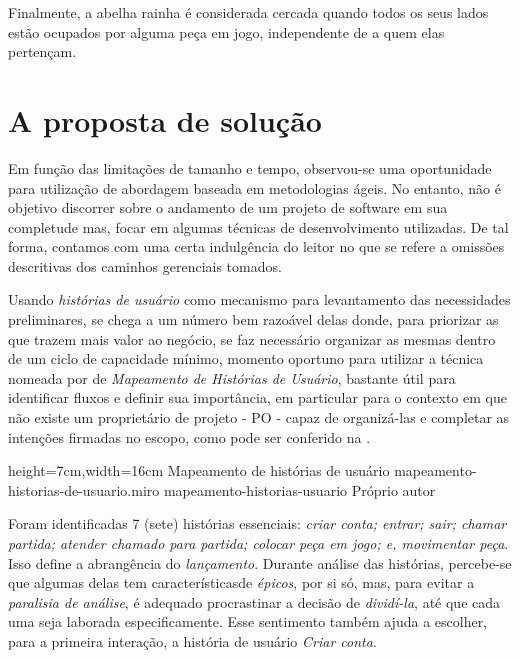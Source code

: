     Finalmente, a abelha rainha é considerada cercada quando todos os seus lados estão ocupados por alguma peça em jogo, independente de a quem elas pertençam.

\section{A proposta de solução}

  Em função das limitações de tamanho e tempo, observou-se uma oportunidade para utilização de abordagem baseada em metodologias ágeis. No entanto, não é objetivo discorrer sobre o andamento de um projeto de software em sua completude mas, focar em algumas técnicas de desenvolvimento utilizadas. De tal forma, contamos com uma certa indulgência do leitor no que se refere a omissões descritivas dos caminhos gerenciais tomados.

  Usando \emph{histórias de usuário} como mecanismo para levantamento das necessidades preliminares, se chega a um número bem razoável delas donde, para priorizar as que trazem mais valor ao negócio, se faz necessário organizar as mesmas dentro de um ciclo de capacidade mínimo, momento oportuno para utilizar a técnica nomeada por  de \emph{Mapeamento de Histórias de Usuário}, bastante útil para identificar fluxos e definir sua importância, em particular para o contexto em que não existe um proprietário de projeto - PO - capaz de organizá-las e completar as intenções firmadas no escopo, como pode ser conferido na .

  \imagem
    {height=7cm,width=16cm}
    {Mapeamento de histórias de usuário}
    {mapeamento-historias-de-usuario.miro}
    {mapeamento-historias-usuario}
    {Próprio autor\footnotemark}

  Foram identificadas 7 (sete) histórias essenciais: \emph{criar conta; entrar; sair; chamar partida; atender chamado para partida; colocar peça em jogo; e, movimentar peça}. Isso define a abrangência do \emph{lançamento}\cite[tradução nossa]{Beck2001}. Durante análise das histórias, percebe-se que algumas delas tem característicasde \emph{épicos}\cite[pág. 6, tradução nossa]{Cohn2004}, por si só, mas, para evitar a \emph{paralisia de análise}\cite[pág. 71, tradução nossa]{Pugh2011}, é adequado procrastinar a decisão de \emph{dividí-la}\cite[pág. 24, tradução nossa]{Cohn2004}, até que cada uma seja laborada especificamente. Esse sentimento também ajuda a escolher, para a primeira interação, a história de usuário \emph{Criar conta}.


